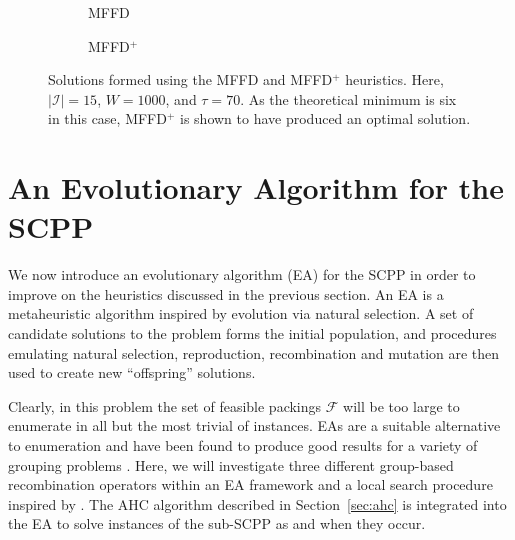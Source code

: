 \documentclass[a4paper,11pt,authoryear]{elsarticle}
\begin{document}
\begin{figure}[h]	
	\centering
	\begin{subfigure}[h]{0.33\textwidth}
		
		\caption{MFFD}
		\label{fig:mffd}
	\end{subfigure} \hspace{15mm}
	\begin{subfigure}[h]{0.33\textwidth}
		
		\caption{MFFD$^+$}
		\label{fig:mffdplus}
	\end{subfigure}
	\caption{Solutions formed using the MFFD and MFFD$^+$ heuristics. Here, $|\mathcal{I}| = 15$, $W = 1000$, and $\tau = 70$. As the theoretical minimum is six in this case, MFFD$^+$ is shown to have produced an optimal solution.}
	\label{fig:mffdvsmffdplus}
\end{figure}

\section{An Evolutionary Algorithm for the SCPP}
\label{sec:ea}
\noindent We now introduce an evolutionary algorithm (EA) for the SCPP in order to improve on the heuristics discussed in the previous section. An EA is a metaheuristic algorithm inspired by evolution via natural selection. A set of candidate solutions to the problem forms the initial population, and procedures emulating natural selection, reproduction, recombination and mutation are then used to create new ``offspring'' solutions. 

Clearly, in this problem the set of feasible packings $\mathcal{F}$ will be too large to enumerate in all but the most trivial of instances. EAs are a suitable alternative to enumeration and have been found to produce good results for a variety of grouping problems \citep{lewis2017, falkenauer1996, quiroz2015}. Here, we will investigate three different group-based recombination operators within an EA framework and a local search procedure inspired by \cite{martello1990l}. The AHC algorithm described in Section~\ref{sec:ahc} is integrated into the EA to solve instances of the sub-SCPP as and when they occur.
\end{document}
